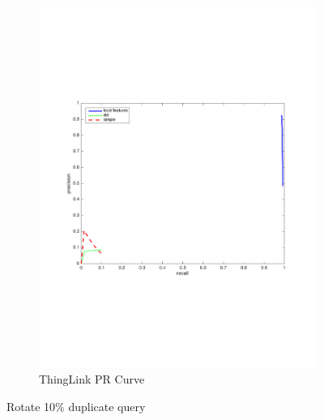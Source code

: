 \documentclass[english,12pt,a4paper,pdftex,elec,utf8, table]{aaltothesis}
\begin{document}
\begin{figure}[htb]
\begin{center}
\begin{subfigure}[b]{0.49\textwidth}
    \includegraphics[width=\textwidth]{figures/thinglink_Rotate10PR.pdf}
    \caption{ThingLink PR Curve}
    \label{Rotateprthinglink}
  \end{subfigure}
  \caption{Rotate 10\% duplicate query}
  \end{center}
\end{figure}
\end{document}
